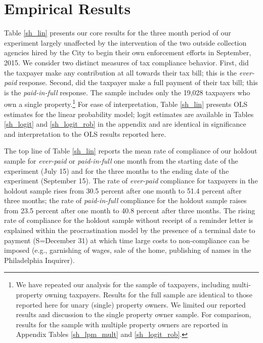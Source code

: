 \section{Empirical Results}

Table \ref{sh_lin} presents our core results for the three month
period of our experiment largely unaffected by the intervention of the
two outside collection agencies hired by the City to begin their own
enforcement efforts in September, 2015. We consider two distinct
measures of tax compliance behavior. First, did the taxpayer make any
contribution at all towards their tax bill; this is the
\textit{ever-paid} response. Second, did the taxpayer make a full
payment of their tax bill; this is the \textit{paid-in-full}
response. The sample includes only the 19,028 taxpayers who own a
single property.\footnote{We have repeated our analysis for the sample
  of taxpayers, including multi-property owning taxpayers. Results
  for the full sample are identical to those reported here for unary
  (single) property owners. We limited our reported results and
  discussion to the single property owner sample. For comparison,
  results for the sample with multiple property owners are reported in
  Appendix Tables \ref{sh_lpm_mult} and \ref{sh_logit_rob}.} For ease
of interpretation, Table \ref{sh_lin} presents OLS estimates for the
linear probability model; logit estimates are available in Tables
\ref{sh_logit} and \ref{sh_logit_rob} in the appendix and are
identical in significance and interpretation to the OLS results
reported here.

The top line of Table \ref{sh_lin} reports the mean rate of compliance
of our holdout sample for \textit{ever-paid} or \textit{paid-in-full}
one month from the starting date of the experiment (July 15) and for
the three months to the ending date of the experiment (September
15). The rate of \textit{ever-paid} compliance for taxpayers in the
holdout sample rises from 30.5 percent after one month to 51.4 percent
after three months; the rate of \textit{paid-in-full} compliance for
the holdout sample raises from 23.5 percent after one month to 40.8
percent after three months. The rising rate of compliance for the
holdout sample without receipt of a reminder letter is explained
within the \cite{DR-99} procrastination model by the presence of a
terminal date to payment (S=December 31) at which time large costs to
non-compliance can be imposed (e.g., garnishing of wages, sale of the
home, publishing of names in the Philadelphia Inquirer).

